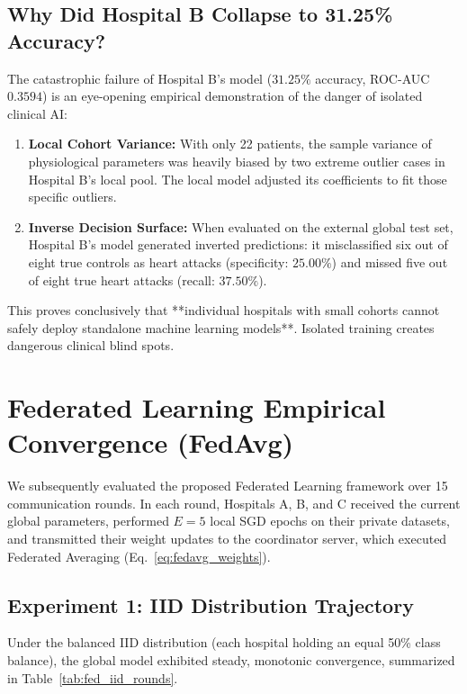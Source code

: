 \documentclass[12pt,a4paper,oneside]{report}
\begin{document}
\subsection{Why Did Hospital B Collapse to 31.25\% Accuracy?}
The catastrophic failure of Hospital B's model ($31.25\%$ accuracy, ROC-AUC $0.3594$) is an eye-opening empirical demonstration of the danger of isolated clinical AI:
\begin{enumerate}
    \item \textbf{Local Cohort Variance:} With only 22 patients, the sample variance of physiological parameters was heavily biased by two extreme outlier cases in Hospital B's local pool. The local model adjusted its coefficients to fit those specific outliers.
    \item \textbf{Inverse Decision Surface:} When evaluated on the external global test set, Hospital B's model generated inverted predictions: it misclassified six out of eight true controls as heart attacks (specificity: $25.00\%$) and missed five out of eight true heart attacks (recall: $37.50\%$).
\end{enumerate}

This proves conclusively that **individual hospitals with small cohorts cannot safely deploy standalone machine learning models**. Isolated training creates dangerous clinical blind spots.

\section{Federated Learning Empirical Convergence (FedAvg)}
\label{sec:federated_results}

We subsequently evaluated the proposed Federated Learning framework over 15 communication rounds. In each round, Hospitals A, B, and C received the current global parameters, performed $E=5$ local SGD epochs on their private datasets, and transmitted their weight updates to the coordinator server, which executed Federated Averaging (Eq.~\ref{eq:fedavg_weights}).

\subsection{Experiment 1: IID Distribution Trajectory}
Under the balanced IID distribution (each hospital holding an equal 50\% class balance), the global model exhibited steady, monotonic convergence, summarized in Table~\ref{tab:fed_iid_rounds}.
\end{document}
